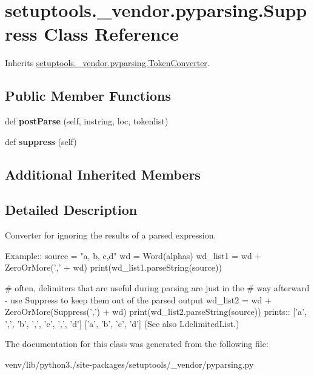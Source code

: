 \hypertarget{classsetuptools_1_1__vendor_1_1pyparsing_1_1_suppress}{}\section{setuptools.\+\_\+vendor.\+pyparsing.\+Suppress Class Reference}
\label{classsetuptools_1_1__vendor_1_1pyparsing_1_1_suppress}


Inherits \hyperlink{classsetuptools_1_1__vendor_1_1pyparsing_1_1_token_converter}{setuptools.\+\_\+vendor.\+pyparsing.\+Token\+Converter}.

\subsection*{Public Member Functions}
\begin{DoxyCompactItemize}
\item 
\mbox{\label{classsetuptools_1_1__vendor_1_1pyparsing_1_1_suppress_a99f780117a65983c3f486a3a0c5c7e73}} 
def {\bfseries post\+Parse} (self, instring, loc, tokenlist)
\item 
\mbox{\label{classsetuptools_1_1__vendor_1_1pyparsing_1_1_suppress_a92b705f99f29fbc08b3c1eadec9cc090}} 
def {\bfseries suppress} (self)
\end{DoxyCompactItemize}
\subsection*{Additional Inherited Members}


\subsection{Detailed Description}
\begin{DoxyVerb}Converter for ignoring the results of a parsed expression.

Example::
    source = "a, b, c,d"
    wd = Word(alphas)
    wd_list1 = wd + ZeroOrMore(',' + wd)
    print(wd_list1.parseString(source))

    # often, delimiters that are useful during parsing are just in the
    # way afterward - use Suppress to keep them out of the parsed output
    wd_list2 = wd + ZeroOrMore(Suppress(',') + wd)
    print(wd_list2.parseString(source))
prints::
    ['a', ',', 'b', ',', 'c', ',', 'd']
    ['a', 'b', 'c', 'd']
(See also L{delimitedList}.)
\end{DoxyVerb}
 

The documentation for this class was generated from the following file\+:\begin{DoxyCompactItemize}
\item 
venv/lib/python3./site-\/packages/setuptools/\+\_\+vendor/pyparsing.\+py\end{DoxyCompactItemize}
